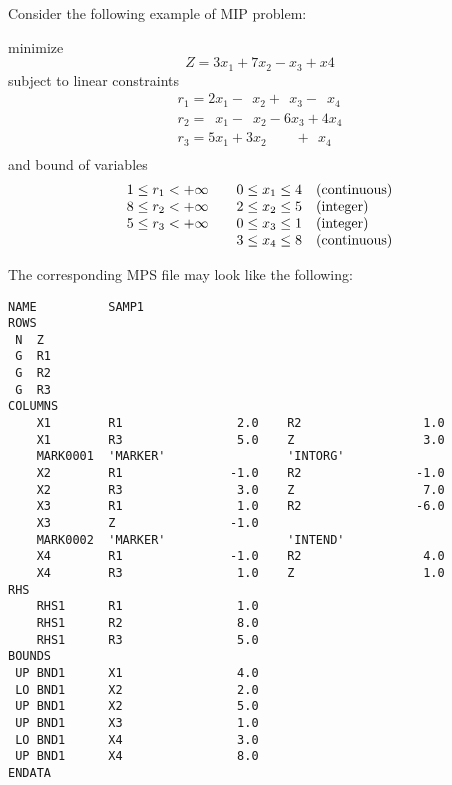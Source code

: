 Consider the following example of MIP problem:

\medskip

\noindent
\hspace{1in} minimize
$$Z = 3 x_1 + 7 x_2 - x_3 + x4$$
\hspace{1in} subject to linear constraints
$$
\begin{array}{c}
\nonumber r_1 = 2   x_1 - \ \ x_2 + \ \ x_3 - \ \;x_4 \\
\nonumber r_2 = \ \;x_1 - \ \;x_2 - 6   x_3 + 4   x_4 \\
\nonumber r_3 = 5   x_1 +   3 x_2 \ \ \ \ \ \ \ \ \ + \ \ x_4 \\
\end{array}
$$
\hspace{1in} and bound of variables
$$
\begin{array}{cccl}
\nonumber 1 \leq r_1 < +\infty && 0 \leq x_1 \leq 4 &{\rm(continuous)}\\
\nonumber 8 \leq r_2 < +\infty && 2 \leq x_2 \leq 5 &{\rm(integer)}   \\
\nonumber 5 \leq r_3 < +\infty && 0 \leq x_3 \leq 1 &{\rm(integer)}   \\
\nonumber                      && 3 \leq x_4 \leq 8 &{\rm(continuous)}\\
\end{array}
$$

The corresponding MPS file may look like the following:

\begin{verbatim}
NAME          SAMP1
ROWS
 N  Z
 G  R1
 G  R2
 G  R3
COLUMNS
    X1        R1                2.0    R2                 1.0
    X1        R3                5.0    Z                  3.0
    MARK0001  'MARKER'                 'INTORG'
    X2        R1               -1.0    R2                -1.0
    X2        R3                3.0    Z                  7.0
    X3        R1                1.0    R2                -6.0
    X3        Z                -1.0
    MARK0002  'MARKER'                 'INTEND'
    X4        R1               -1.0    R2                 4.0
    X4        R3                1.0    Z                  1.0
RHS
    RHS1      R1                1.0
    RHS1      R2                8.0
    RHS1      R3                5.0
BOUNDS
 UP BND1      X1                4.0
 LO BND1      X2                2.0
 UP BND1      X2                5.0
 UP BND1      X3                1.0
 LO BND1      X4                3.0
 UP BND1      X4                8.0
ENDATA
\end{verbatim}

